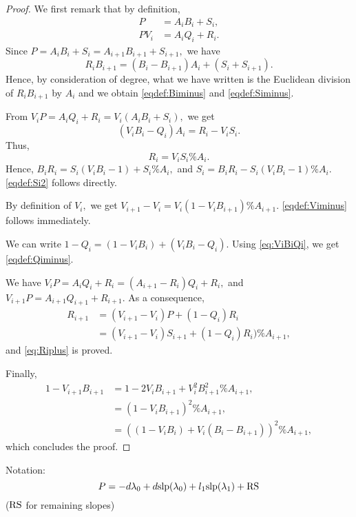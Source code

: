 \documentclass{sig-alternate-2013}
\newcommand{\slp}{\text{\rm slp}}
\newcommand{\RS}{\text{\rm RS}}
\begin{document}
\begin{proof}
We first remark that by definition,
\begin{align*}
P &= A_i B_i + S_i, \\
P V_i&= A_i Q_i + R_i.
\end{align*}
Since $P= A_i B_i + S_i= A_{i+1} B_{i+1} + S_{i+1},$ we have \[R_i B_{i+1}= (B_i -B_{i+1})A_i + (S_i+S_{i+1}).\]
Hence, by consideration of degree, what we have written is the Euclidean division of $R_i B_{i+1}$ by $A_i$ and we obtain \eqref{eqdef:Biminus} and \eqref{eqdef:Siminus}.

From $V_i P =  A_i Q_i + R_i=V_i (A_i B_i + S_i),$ we get \begin{equation}(V_i B_i -Q_i) A_i=R_i-V_i S_i. \label{eq:ViBiQi} \end{equation} Thus, \[ R_i=V_i S_i \% A_i.\]
Hence, $B_i R_i =S_i (V_iB_i-1)+S_i \% A_i,$ and $S_i=B_i R_i-S_i (V_iB_i-1) \% A_i.$ \eqref{eqdef:Si2} follows directly.

By definition of $V_i,$ we get $V_{i+1}-V_i=V_i (1-V_i B_{i+1}) \% A_{i+1}.$ \eqref{eqdef:Viminus} follows immediately.

We can write $1-Q_i=(1-V_i B_i)+(V_i B_i - Q_i).$ Using \eqref{eq:ViBiQi}, we get \eqref{eqdef:Qiminus}.

We have $V_i P=A_i Q_i+R_i=(A_{i+1}-R_i)Q_i+R_i,$ and $V_{i+1} P=A_{i+1} Q_{i+1}+R_{i+1}.$ As a consequence, 
\begin{align*}
R_{i+1} &= (V_{i+1}-V_i)P+(1-Q_i)R_i \\
 &= (V_{i+1}-V_i)S_{i+1}+(1-Q_i)R_i) \% A_{i+1},
\end{align*} and \eqref{eq:Riplus} is proved.

Finally, \begin{align*}
1-V_{i+1}B_{i+1} &= 1-2V_i B_{i+1}+V_i^2 B_{i+1}^2 \% A_{i+1}, \\
&= (1-V_i B_{i+1})^2 \% A_{i+1}, \\
&= ((1-V_i B_i)+V_i (B_i-B_{i+1}))^2 \% A_{i+1},
\end{align*} which concludes the proof.
\end{proof}

\begin{deftn}
Notation:
\[P=-d \lambda_0+d \slp(\lambda_0) + l_1 \slp (\lambda_1)+\RS \]
($\RS$ for remaining slopes)

\end{deftn}
\end{document}
